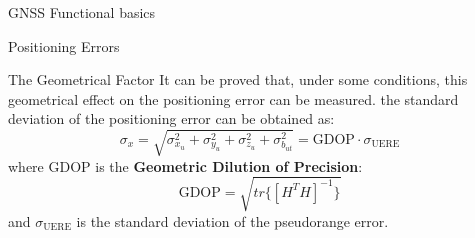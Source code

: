 \begin{section}{GNSS Functional basics}
\begin{section}{Positioning Errors}
\begin{subsection}{The Geometrical Factor}
        It can be proved that, under some conditions, this geometrical effect on the positioning 
        error can be measured.
        the standard deviation of the positioning error can be obtained as:
        \begin{equation}
          \sigma_{x} = \sqrt{\sigma^2_{x_u} + \sigma^2_{y_u} + \sigma^2_{z_u} + \sigma^2_{b_{ut}}}
          =\text{GDOP} \cdot \sigma_{\text{UERE}}
          \label{eq:GNSS PDOP}
        \end{equation}
        where GDOP is the \textbf{Geometric Dilution of Precision}:
        \begin{equation}
          \text{GDOP} = \sqrt{tr\{[H^TH]^{-1}\}}
          \label{eq:GNSS GDOP}
        \end{equation}
        and $\sigma_{\text{UERE}}$ is the standard deviation of the pseudorange error.\\
      \end{subsection}
    \end{section}

    \end{section}

